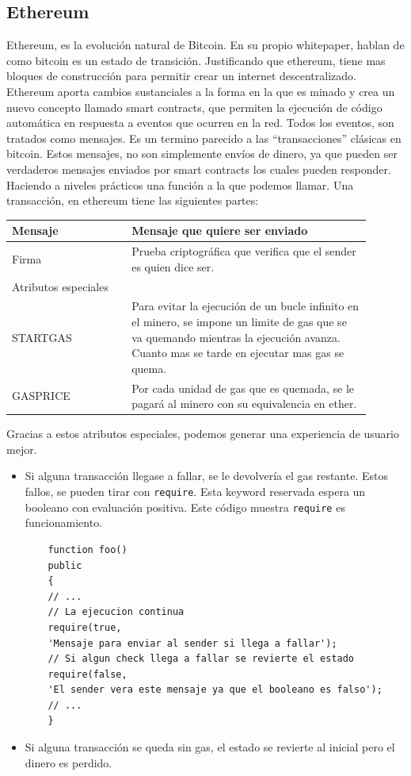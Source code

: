 \subsection*{Ethereum}
Ethereum, es la evolución natural de Bitcoin. En su propio whitepaper, hablan de como bitcoin es un estado de transición. Justificando que ethereum, tiene mas bloques de construcción para permitir crear un internet descentralizado. Ethereum aporta cambios sustanciales a la forma en la que es minado y crea un nuevo concepto llamado smart contracts, que permiten la ejecución de código automática en respuesta a eventos que ocurren en la red.
Todos los eventos, son tratados como mensajes. Es un termino parecido a las “transacciones” clásicas en bitcoin. Estos mensajes, no son simplemente envíos de dinero, ya que pueden ser verdaderos mensajes enviados por smart contracts los cuales pueden responder. Haciendo a niveles prácticos una función a la que podemos llamar.
Una transacción, en ethereum tiene las siguientes partes:
\begin{center}
    \begin{tabular}{p{0.3\linewidth} | p{0.6\linewidth}}
        \hline
        Mensaje & Mensaje que quiere ser enviado \\
        \hline
        Firma   & Prueba criptográfica que verifica que el sender es quien dice ser. \\
        \hline
        Atributos especiales \\
        \hline
        STARTGAS &  Para evitar la ejecución de un bucle infinito en el minero, se impone un limite de gas que se va quemando mientras la ejecución avanza. Cuanto mas se tarde en ejecutar mas gas se quema. \\
        \hline
        GASPRICE & Por cada unidad de gas que es quemada, se le pagará al minero con su equivalencia en ether. \\
        \hline
    \end{tabular}
\end{center}
Gracias a estos atributos especiales, podemos generar una experiencia de usuario mejor.
\begin{itemize}
    \item Si alguna transacción llegase a fallar, se le devolvería el gas restante. Estos fallos, se pueden tirar con \texttt{require}. Esta keyword reservada espera un booleano con evaluación positiva.
Este código muestra \texttt{require} es funcionamiento.
\begin{lstlisting}
    function foo()
    public
    {
    // ... 
    // La ejecucion continua
    require(true,
    'Mensaje para enviar al sender si llega a fallar');
    // Si algun check llega a fallar se revierte el estado 
    require(false,
    'El sender vera este mensaje ya que el booleano es falso');
    // ...
    }
\end{lstlisting}
    \item Si alguna transacción se queda sin gas, el estado se revierte al inicial pero el dinero es perdido.
\end{itemize}

